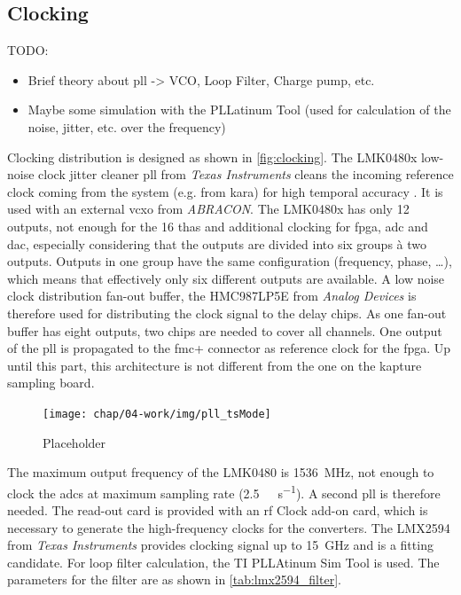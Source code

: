 \subsection{Clocking}
TODO:
\begin{itemize}
	\item Brief theory about \gls{pll} -> VCO, Loop Filter, Charge pump, etc.
	\item Maybe some simulation with the PLLatinum Tool (used for calculation of the noise, jitter, etc. over the frequency)
\end{itemize}
Clocking distribution is designed as shown in \autoref{fig:clocking}.
The LMK0480x low-noise clock jitter cleaner \gls{pll} from \textit{Texas Instruments} cleans the incoming reference clock coming from the system (e.g. from \gls{kara}) for high temporal accuracy \cite{caselle2013}.
It is used with an external \gls{vcxo} from \textit{ABRACON}.
The LMK0480x has only 12 outputs, not enough for the 16 \glspl{tha} and additional clocking for \gls{fpga}, \gls{adc} and \gls{dac}, especially considering that the outputs are divided into six groups à two outputs. Outputs in one group have the same configuration (frequency, phase, \ldots), which means that effectively only six different outputs are available.
A low noise clock distribution fan-out buffer, the HMC987LP5E from \textit{Analog Devices} is therefore used for distributing the clock signal to the delay chips.
As one fan-out buffer has eight outputs, two chips are needed to cover all channels.
One output of the \gls{pll} is propagated to the \gls{fmc}+ connector as reference clock for the \gls{fpga}.
Up until this part, this architecture is not different from the one on the \gls{kapture} sampling board. 

\begin{figure}[tbh]
	\centering
	\texttt{[image: chap/04-work/img/pll\_tsMode]}
	\caption{Placeholder}
	\label{fig:clocking}
\end{figure}

The maximum output frequency of the LMK0480 is \SI{1536}{\mega \hertz}, not enough to clock the \glspl{adc} at maximum sampling rate (\SI{2.5}{\giga \sample \per \second}). A second \gls{pll} is therefore needed. The read-out card is provided with an \gls{rf} Clock add-on card, which is necessary to generate the high-frequency clocks for the converters. The LMX2594 from \textit{Texas Instruments} provides clocking signal up to \SI{15}{\giga \hertz} and is a fitting candidate. For loop filter calculation, the TI PLLAtinum Sim Tool is used. The parameters for the filter are as shown in \autoref{tab:lmx2594_filter}.

